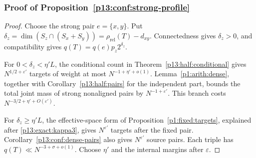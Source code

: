 \subsubsection{Proof of Proposition~\ref{p13:conf:strong-profile}}
\label{p14:comp:confinement:strong}

\begin{proof}
Choose the strong pair \(e=\{x,y\}\). Put
\(\delta_z=\dim(S_z\cap(S_x+S_y))
 =\rho_{\mathrm{rel}}(T)-d_{xy}\).
Connectedness gives \(\delta_z>0\), and compatibility gives
\(q(T)=q(e)p_z2^{\delta_z}\).

For \(0<\delta_z<\eta'L\), the conditional count
in Theorem~\ref{p13:half:conditional} gives
\(N^{1/2+\varepsilon'}\) targets of weight at most
\(N^{-1+\eta'+o(1)}\).
Lemma~\ref{p1:arith:dense}, together with
Corollary~\ref{p13:half:pairs} for the independent
part, bounds the total joint mass of strong nonaligned
pairs by \(N^{-1+\varepsilon'}\).
This branch costs \(N^{-3/2+\eta'+O(\varepsilon')}\).

For \(\delta_z\ge\eta'L\), the effective-space form of
Proposition~\ref{p1:fixed:targets}, explained after
\eqref{p13:exact:kappa3}, gives \(N^{\varepsilon'}\)
targets after the fixed pair.
Corollary~\ref{p13:conf:dense-pairs} also gives
\(N^{\varepsilon'}\) source pairs.
Each triple has \(q(T)\ll N^{-3+\sigma+o(1)}\).
Choose \(\eta'\) and the internal margins after
\(\varepsilon\).
\end{proof}
